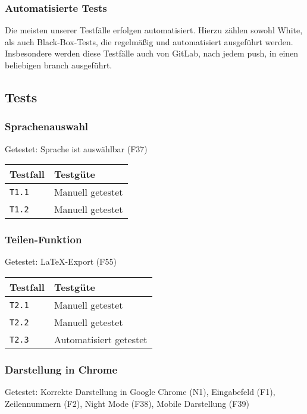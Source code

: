 \documentclass[parskip=full,11pt,twoside]{scrartcl}
\newcommand{\testline}[2]{
    \texttt{#1} & 
    \ifthenelse{\equal{#2}{Nicht getestet}}
        {\cellcolor{red!20}}
        {}
    \ifthenelse{\equal{#2}{Manuell getestet}}
        {\cellcolor{LimeGreen!20}}
        {}
    \ifthenelse{\equal{#2}{Automatisiert getestet}}
        {\cellcolor{green!20}}
        {}
    \ifthenelse{\equal{#2}{Nicht testbar}}
    {\cellcolor{gray!20}}
     {}
    #2 \\ \hline
}
\begin{document}
\subsubsection{Automatisierte Tests}
Die meisten unserer Testfälle erfolgen automatisiert.
Hierzu zählen sowohl White, als auch Black-Box-Tests, die regelmäßig und automatisiert ausgeführt werden.
Insbesondere werden diese Testfälle auch von GitLab, nach jedem push, in einen beliebigen branch ausgeführt.

\subsection{Tests}

\subsubsection{Sprachenauswahl}
    Getestet:
    Sprache ist auswählbar (F37)

    \label{shortcuts}
    \begin{center}
        \begin{tabular}{ p{9cm} p{4cm}}
            Testfall & Testgüte \\ \hline
            \testline{T1.1}{Manuell getestet}
            \testline{T1.2}{Manuell getestet}
        \end{tabular}
    \end{center}

\subsubsection{Teilen-Funktion}
    Getestet:
    LaTeX-Export (F55)

    \label{shortcuts}
    \begin{center}
        \begin{tabular}{ p{9cm} p{4cm}}
            Testfall & Testgüte \\ \hline
            \testline{T2.1}{Manuell getestet}
            \testline{T2.2}{Manuell getestet}
            \testline{T2.3}{Automatisiert getestet}
        \end{tabular}
    \end{center}

\subsubsection{Darstellung in Chrome}
    Getestet:
    Korrekte Darstellung in Google Chrome (N1),
    Eingabefeld (F1),
    Zeilennummern (F2),
    Night Mode (F38),
    Mobile Darstellung (F39)
\end{document}
